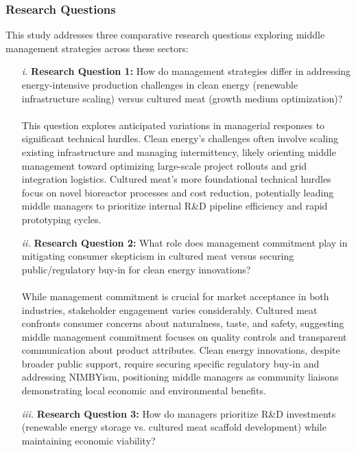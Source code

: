 	\subsubsection{Research Questions}
	This study addresses three comparative research questions exploring middle management strategies across these sectors:
	\begin{enumerate}
		\item[\textit{i.}] \textbf{Research Question 1:} How do management strategies differ in addressing energy-intensive production challenges in clean energy (renewable infrastructure scaling) versus cultured meat (growth medium optimization)?
		
		\paragraph*{} This question explores anticipated variations in managerial responses to significant technical hurdles. Clean energy’s challenges often involve scaling existing infrastructure and managing intermittency, likely orienting middle management toward optimizing large-scale project rollouts and grid integration logistics. Cultured meat’s more foundational technical hurdles focus on novel bioreactor processes and cost reduction, potentially leading middle managers to prioritize internal R\&D pipeline efficiency and rapid prototyping cycles.
		
		\item[\textit{ii.}] \textbf{Research Question 2:} What role does management commitment play in mitigating consumer skepticism in cultured meat versus securing public/regulatory buy-in for clean energy innovations?
		
		\paragraph*{} While management commitment is crucial for market acceptance in both industries, stakeholder engagement varies considerably. Cultured meat confronts consumer concerns about naturalness, taste, and safety, suggesting middle management commitment focuses on quality controls and transparent communication about product attributes. Clean energy innovations, despite broader public support, require securing specific regulatory buy-in and addressing NIMBYism, positioning middle managers as community liaisons demonstrating local economic and environmental benefits.
		
		\item[\textit{iii.}] \textbf{Research Question 3:} How do managers prioritize R\&D investments (renewable energy storage vs. cultured meat scaffold development) while maintaining economic viability?
		

\end{enumerate}
